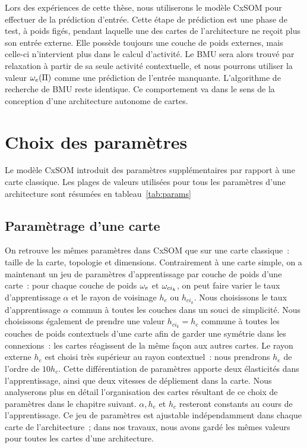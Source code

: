 \documentclass[../main]{subfiles}
\begin{document}
Lors des expériences de cette thèse, nous utiliserons le modèle CxSOM pour effectuer de la prédiction d'entrée. 
Cette étape de prédiction est une phase de test, à poids figés, pendant laquelle une des cartes de l'architecture ne reçoit plus son entrée externe. Elle possède toujours une couche de poids externes, mais celle-ci n'intervient plus dans le calcul d'activité.
Le BMU sera alors trouvé par relaxation à partir de sa seule activité contextuelle, et nous pourrons utiliser la valeur $\omega_e(\Pi)$ comme une prédiction de l'entrée manquante.
L'algorithme de recherche de BMU reste identique. Ce comportement va dans le sens de la conception d'une architecture autonome de cartes.

\section{Choix des paramètres}\label{sec:params}

Le modèle CxSOM introduit des paramètres supplémentaires par rapport à une carte classique. Les plages de valeurs utilisées pour tous les paramètres d'une architecture sont résumées en tableau~\ref{tab:params}

\subsection{Paramètrage d'une carte}
On retrouve les mêmes paramètres dans CxSOM que sur une carte classique~: taille de la carte, topologie et dimensions. 
Contrairement à une carte simple, on a maintenant un jeu de paramètres d'apprentissage par couche de poids d'une carte~: pour chaque couche de poids $\omega_e$ et $\omega_{ci_k}$, on peut faire varier le taux d'apprentissage $\alpha$ et le rayon de voisinage $h_e$ ou $h_{ci_k}$. 
Nous choisissons le taux d'apprentissage $\alpha$ commun à toutes les couches dans un souci de simplicité. 
Nous choisissons également de prendre une valeur $h_{ci_k} = h_c$ commune à toutes les couches de poids contextuels d'une carte afin de garder une symétrie dans les connexions~: les cartes réagissent de la même façon aux autres cartes.
Le rayon externe  $h_e$ est choisi très supérieur au rayon contextuel~: nous prendrons $h_e$ de l'ordre de $10 h_c$. Cette différentiation de paramètres apporte deux élasticités dans l'apprentissage, ainsi que deux vitesses de dépliement dans la carte.
Nous analyserons plus en détail l'organisation des cartes résultant de ce choix de paramètres dans le chapitre suivant.
$\alpha, h_e$ et $h_c$ resteront constants au cours de l'apprentissage.
Ce jeu de paramètres est ajustable indépendamment dans chaque carte de l'architecture~; dans nos travaux, nous avons gardé les mêmes valeurs pour toutes les cartes d'une architecture.
\end{document}
